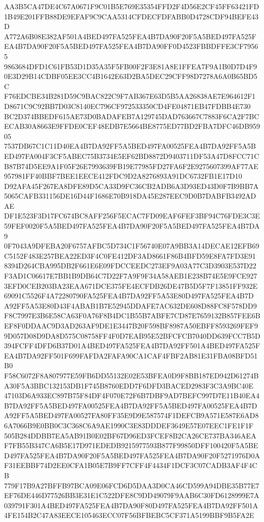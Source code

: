 \documentclass[UTF8,fontset=fandol,zihao=-4,a4paper]{ctexart}
\begin{document}
{{AA3B5CA47DE4C67A0671F9C01B5E769E35354FFD2F4D56E2CF45FF63421FD1B49E201FFB88DE9EFAF9C9CAA5314CFDECFDFABB0D4728CDF94BEFE43D
A772A6B08E382AF501A4BED497FA525FEA4B7DA90F20F5A5BED497FA525FEA4B7DA90F20F5A5BED497FA525FEA4B7DA90FF0D4523FBBDFFE3CF79565
9863684DFD1C61FB53D1D35A35F5FB00F2F3E81A8E1FFEA7F9A1B0D7D4F90E3D29B14CDBF05EE3CC4B1642E63D2BA5DEC29CFF98D7278A6A0B65BD5C
F76EDCBE34B281D59C9BAC822C9F7AB367E63D5B5AA26838AE7E964612F1D8671C9C92BB7D03C8140EC796CF972533350CD4FE04871EB47FDBB4E730
BC2D374BBEDF615AE73D0BADAFEB7A129745DAD763667C7883F6CA2F7BCECAB30A8663E9FFDE0CEF48EDB7E5664BE8775ED77BD2FBA7DFC46DB95905
7537DB67C1C11D40EA4B7DA92FF5A5BED497FA00525FEA4B7DA92FF5A5BED497FA004F3CF5ABEC75B3734E5EF62BD8872D9403711DF53A47D8FCC71C
B87B74D5EE9A1F05F26E7993639FB19E77985FD27FA6F2E9275607399AF77AE957981FF40BBF7BEE1EECE412FDC9D2A8276893A91DC6732FB1E17D10
D92AFA45F267EA8DFE89D5CA33D9FC36CB2ADB6A3D93ED43D0F7B9BB7A5065CAFB331156DE16D44F1686E70B918DA45E287EEC9D0B7DABFB3492ADAE
DF1E523F3D17FC674BC8AFF256F5ECAC7FD09EAF6FEF3BF94C76FDE3C3E59FEF0020F5A5BED497FA525FEA4B7DA90F20F5A5BED497FA525FEA4B7DA9
0F7043A9DFEBA20F6757AFBC5D734C1F56740E07A9BB3A14DECAE12EFB69C5152F483E257BEA22ED3F4C0FE412DF3AD8661F86B4BFD59E8FA7FD3E91
8394D264CBA995DB2F661E6E09FDCCEEDC273EF9A03A77C3D3903E537D22F3AD1C06617E7BB1B9DB64C7D22F7A9F9F34A58AEB1E238B74E5E9FCE927
3EFD0CEB203BA23EAA671DCE375FE4ECFDB26DE47B5D5F7F13851FF932E69091C5526F4A72280790FA525FEA4B7DA92FF5A53E80D497FA525FEA4B7D
A92FF5A53E80D43F4ABAB1B7E52945DDAFE7AC632DE608D88FC8F578DD9F8C7997E3B6E58CA63F0A76F8B4DC1B55B7ABFE7CD87E7659132B857FEE6B
EF8F0DDAAC9D3AD263AF9DE1E3447B20F598BF8987A50EBFF8593269FEF99D057D08D9DA8D575C08758FF4F0D7EAB95E52BFCFCB7040DD639FCC7B5D
394FCFF4DFD6B37D01A4BED497FA525FEA4B7DA92FF501A4BED497FA525FEA4B7DA92FF501F699FAFDA2FAFA90CA1CAF4FBF2AB81E31FBA08BFD51B0
F58C6072F8A807977E59FB6DD55132E02E53BFEA0D9F8BB187ED942D61274BA30F5A3BBC132153DB1F745B8760EDD7F6DFD3BACED2983F3C3A9BC40E
47103D6A933EC897B75F84DF4F070E72F6B7DBF9AD7BEFC997D7E11B40EA4B7DA92FF5A5BED497FA00525FEA4B7DA92FF5A5BED497FA00525FEA4B7D
A92FF5A5BED497FA00527FA80FF35E9D9E587574F1DEFCB9A571E587E6AD86A7066B9E0BB0C3C368C6A9AE1990C3E83DDDEF3649E57E07EEC1FE1F1F
505B284DDBB7EA5AB91B0E02BF67D96ED3FCEF8B2CA26CE737BA346AEAF7FB55B347CA6B5E17D971EDEDB9215977593B877F99850DFF100420F5A5BE
D497FA525FEA4B7DA90F20F5A5BED497FA525FEA4B7DA90F20F5271976D0AF31EEBBF74D2EE0CFA1B05E7B9FF7CFF4F4434F1DCF3C07CADB3AF4F4CB
779F17B9A27BFFB97BCA09E06FCD6D5DAA3D0CA46CD599A94DBE35B77E7EF76DE446D77526BB3E31E1C522DFE8C9DD49079F9AAB6C30FD6128999E7A
039791F301A4BED497FA525FEA4B7DA90F80D497FA525FEA4B7DA92FF501A4FE154B2C47A83EECE105463ECC07F56BFBEBC5CF371A5199BBF9B5FA2E
}}
\end{document}
